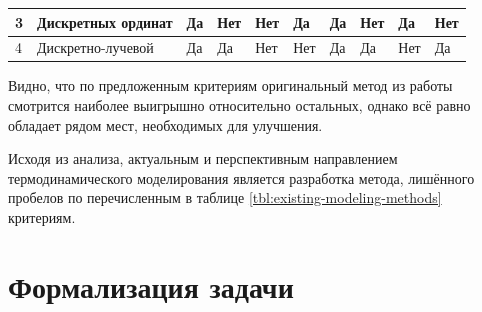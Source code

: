 \begin{FixLineStretch}
\begin{table}
\begin{tabular}{|p{\wA}|p{\wB}|p{\wC}|p{\wD}|p{\wE}|p{\wF}|p{\wG}|p{\wH}|p{\wI}|p{\wJ}|}
		3                    & \everypar{\hspace*{0pt}} Дискретных ординат \cite{surzhikov}                                            & Да                                                           & Нет                                                                             & Нет                                                                               & Да                                                       & Да                                                                                             & Нет                                                                                                        & Да                                                           & Нет                                      \\ \hline
		4                    & \everypar{\hspace*{0pt}} Дискретно-лучевой \cite{gradov-dissertation}                                   & Да                                                           & Да                                                                              & Нет                                                                               & Нет                                                      & Да                                                                                             & Да                                                                                                         & Нет                                                          & Да                                       \\ \hline
	\end{tabular}
\end{table}
\end{FixLineStretch}
\let\wJ\relax
\let\wI\relax
\let\wH\relax
\let\wG\relax
\let\wF\relax
\let\wE\relax
\let\wD\relax
\let\wC\relax
\let\wB\relax
\let\wA\relax

\pagebreak

Видно, что по предложенным критериям оригинальный метод из работы \cite{gradov-dissertation} смотрится наиболее выигрышно относительно остальных, однако всё равно обладает рядом мест, необходимых для улучшения.

Исходя из анализа, актуальным и перспективным направлением термодинамического моделирования является разработка метода, лишённого пробелов по перечисленным в таблице \ref{tbl:existing-modeling-methods} критериям.

\section{Формализация задачи}


\let\wF\relax